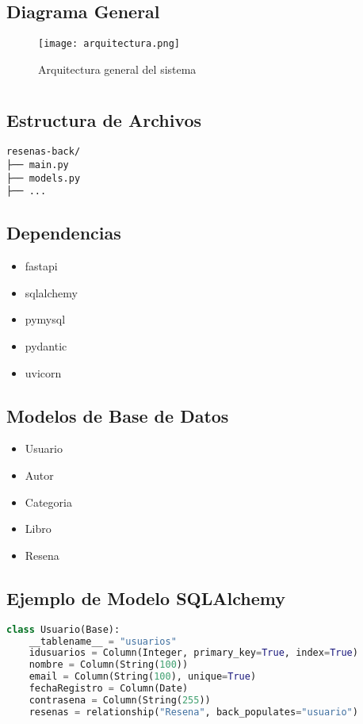 \documentclass[10pt,a4paper]{article}
\begin{document}
\subsection{Diagrama General}
\begin{figure}[H]
    \centering
    \texttt{[image: arquitectura.png]}
    \caption{Arquitectura general del sistema}
\end{figure}

\section{\color{colorIPN}{Backend: FastAPI}}

\subsection{Estructura de Archivos}
\begin{verbatim}
resenas-back/
├── main.py
├── models.py
├── ...
\end{verbatim}

\subsection{Dependencias}
\begin{itemize}
    \item fastapi
    \item sqlalchemy
    \item pymysql
    \item pydantic
    \item uvicorn
\end{itemize}

\subsection{Modelos de Base de Datos}
\begin{itemize}
    \item Usuario
    \item Autor
    \item Categoria
    \item Libro
    \item Resena
\end{itemize}

\subsection{Ejemplo de Modelo SQLAlchemy}
\begin{lstlisting}[language=Python]
class Usuario(Base):
    __tablename__ = "usuarios"
    idusuarios = Column(Integer, primary_key=True, index=True)
    nombre = Column(String(100))
    email = Column(String(100), unique=True)
    fechaRegistro = Column(Date)
    contrasena = Column(String(255))
    resenas = relationship("Resena", back_populates="usuario")
\end{lstlisting}
\end{document}
